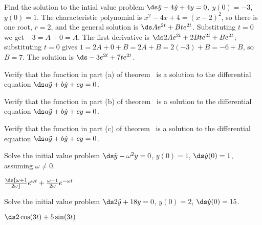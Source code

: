 \begin{example} Find the solution to the intial value problem
$\ds\ddot y-4\dot y+4y=0$, $y(0)=-3$, $\dot y(0)=1$. The
characteristic polynomial is $x^2-4x+4=(x-2)^2$, so there is one root,
$r=2$, 
and the general solution is $\ds Ae^{2t}+Bte^{2t}$. Substituting
$t=0$ we get $-3=A+0=A$. The first derivative is
$\ds 2Ae^{2t}+2Bte^{2t}+Be^{2t}$; substituting $t=0$ gives
$1=2A+0+B=2A+B=2(-3)+B=-6+B$, so $B=7$. The solution is
$\ds -3e^{2t}+7te^{2t}$.
\end{example}

\begin{exercises}

\exercise Verify that the function in part (a) of
theorem~ is a solution to
the differential equation $\ds a\ddot y+b\dot y+cy=0$.

\exercise Verify that the function in part (b) of
theorem~ is a solution to
the differential equation $\ds a\ddot y+b\dot y+cy=0$.

\exercise Verify that the function in part (c) of
theorem~ is a solution to
the differential equation $\ds a\ddot y+b\dot y+cy=0$.

\exercise Solve the initial value problem $\ds\ddot y-\omega^2y=0$,
$y(0)=1$, $\ds\dot y(0)=1$, assuming $\omega\not=0$.
\begin{answer} $\ds {\omega+1\over2\omega}e^{\omega t}+
{\omega-1\over2\omega}e^{-\omega t}$
\end{answer}

\exercise Solve the initial value problem $\ds2\ddot y+18y=0$,
$y(0)=2$, $\ds\dot y(0)=15$.
\begin{answer} $\ds 2\cos(3t)+5\sin(3t)$
\end{answer}


\end{exercises}
